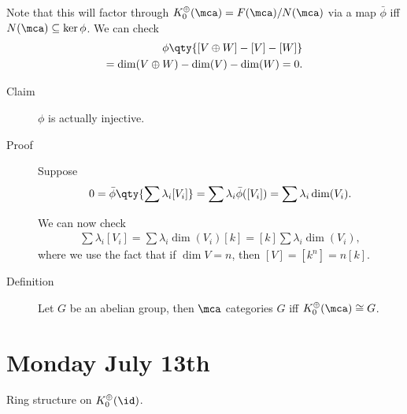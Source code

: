Note that this will factor through
\(K_0^\oplus(\mca) = F(\mca)/ N(\mca)\) via a map \(\bar\phi\) iff
\(N(\mca) \subseteq \ker \phi\). We can check \begin{align*}
\phi\qty{[V\oplus W] - [V] - [W] } \\
= \dim(V\oplus W) - \dim(V) - \dim(W) = 0
.\end{align*}

\begin{description}
\item[Claim]
\(\phi\) is actually injective.
\item[Proof]
Suppose \begin{align*}
0 = \bar\phi\qty{ \sum \lambda_i [V_i]} = \sum \lambda_i \bar \phi([V_i]) = \sum \lambda_i \dim(V_i)
.\end{align*}

We can now check \begin{align*}
\sum \lambda_i [V_i] = \sum \lambda_i \dim(V_i) [k] = [k] \sum \lambda_i \dim(V_i)
,\end{align*} where we use the fact that if \(\dim V = n\), then
\([V] = [k^n] = n[k]\).
\item[Definition]
Let \(G\) be an abelian group, then \(\mca\) categories \(G\) iff
\(K_0^\oplus(\mca) \cong G\).
\end{description}

\hypertarget{monday-july-13th}{%
\section{Monday July 13th}\label{monday-july-13th}}

Ring structure on \(K_0^\oplus(\id)\).

